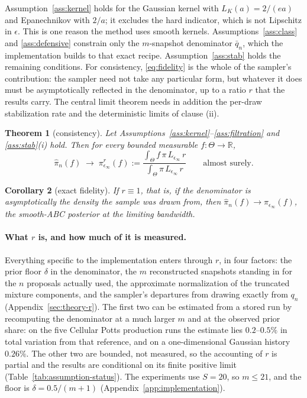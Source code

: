 \documentclass[10pt]{article}
\theoremstyle{plain}
\newtheorem{theorem}{Theorem}
\newtheorem{corollary}[theorem]{Corollary}
\theoremstyle{definition}
\begin{document}
Assumption~\ref{ass:kernel} holds for the Gaussian kernel with $L_K(a)=2/(ea)$ and Epanechnikov with $2/a$; it excludes the hard indicator, which is not Lipschitz in $\epsilon$. This is one reason the method uses smooth kernels. Assumptions~\ref{ass:class} and \ref{ass:defensive} constrain only the $m$-snapshot denominator $\bar q_n$, which the implementation builds to that exact recipe. Assumption~\ref{ass:stab} holds the remaining conditions. For consistency, \eqref{eq:fidelity} is the whole of the sampler's contribution: the sampler need not take any particular form, but whatever it does must be asymptotically reflected in the denominator, up to a ratio $r$ that the results carry. The central limit theorem needs in addition the per-draw stabilization rate and the deterministic limits of clause (ii).

\begin{theorem}[consistency]\label{thm:consistency}
Let Assumptions~\ref{ass:kernel}--\ref{ass:filtration} and \ref{ass:stab}(i) hold. Then for every bounded measurable $f:\Theta\to\mathbb{R}$,
\begin{equation}
\widehat\pi_n(f)\;\longrightarrow\;\pi^{r}_{\epsilon_\infty}(f):=\frac{\int_\Theta f\,\pi\,L_{\epsilon_\infty}\,r}{\int_\Theta \pi\,L_{\epsilon_\infty}\,r}
\qquad\text{almost surely.}
\label{eq:tilted-target}
\end{equation}
\end{theorem}

\begin{corollary}[exact fidelity]\label{cor:exact}
If $r\equiv1$, that is, if the denominator is asymptotically the density the sample was drawn from, then $\widehat\pi_n(f)\to\pi_{\epsilon_\infty}(f)$, the smooth-ABC posterior at the limiting bandwidth.
\end{corollary}

\paragraph{What $r$ is, and how much of it is measured.} Everything specific to the implementation enters through $r$, in four factors: the prior floor $\delta$ in the denominator, the $m$ reconstructed snapshots standing in for the $n$ proposals actually used, the approximate normalization of the truncated mixture components, and the sampler's departures from drawing exactly from $q_n$ (Appendix~\ref{sec:theory-r}). The first two can be estimated from a stored run by recomputing the denominator at a much larger $m$ and at the observed prior share: on the five Cellular Potts production runs the estimate lies $0.2$--$0.5\%$ in total variation from that reference, and on a one-dimensional Gaussian history $0.26\%$. The other two are bounded, not measured, so the accounting of $r$ is partial and the results are conditional on its finite positive limit (Table~\ref{tab:assumption-status}). The experiments use $S=20$, so $m\le21$, and the floor is $\delta=0.5/(m{+}1)$ (Appendix~\ref{app:implementation}).
\end{document}
